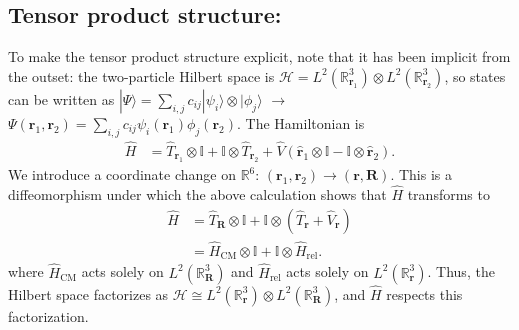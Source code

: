 \subsection{Tensor product structure:}
To make the tensor product structure explicit, note that it has been implicit from the outset: the two-particle Hilbert space is $\mathcal{H}=L^2(\mathbb{R}^3_{\mathbf{r}_1})\otimes L^2(\mathbb{R}^{3}_{\mathbf{r}_2})$, so states can be written as $|\Psi\rangle = \sum_{i,j}c_{ij}|\psi_i\rangle\otimes|\phi_j\rangle$ $\rightarrow$ $\Psi(\mathbf{r}_1, \mathbf{r}_2)=\sum_{i,j}c_{ij}\psi_i(\mathbf{r}_1)\phi_j(\mathbf{r}_2)$. The Hamiltonian is 
\begin{align*}
    \hat{H} &= \hat{T}_{\mathbf{r}_1}\otimes \mathbb{I} + \mathbb{I}\otimes \hat{T}_{\mathbf{r}_2} + \hat{V}(\hat{\mathbf{r}}_1\otimes\mathbb{I}-\mathbb{I}\otimes \hat{\mathbf{r}}_2).
\end{align*}
We introduce a coordinate change on $\mathbb{R}^6$: $(\mathbf{r}_1, \mathbf{r}_2)\rightarrow(\mathbf{r}, \mathbf{R})$. This is a diffeomorphism under which the above calculation shows that $\hat{H}$ transforms to 
\begin{align*}
    \hat{H}&= \hat{T}_{\mathbf{R}}\otimes \mathbb{I} + \mathbb{I}\otimes(\hat{T}_{\mathbf{r}} + \hat{V}_{\mathbf{r}})\\
    &=\hat{H}_{\text{CM}}\otimes\mathbb{I} + \mathbb{I}\otimes \hat{H}_{\text{rel}}.
\end{align*}
where $\hat{H}_{\text{CM}}$ acts solely on $L^2(\mathbb{R}^3_{\mathbf{R}})$ and $\hat{H}_{\text{rel}}$ acts solely on $L^2(\mathbb{R}^3_{\mathbf{r}})$. Thus, the Hilbert space factorizes as $\mathcal{H}\cong L^2(\mathbb{R}^3_{\mathbf{r}})\otimes L^2(\mathbb{R}^3_{\mathbf{R}})$, and $\hat{H}$ respects this factorization.\\

